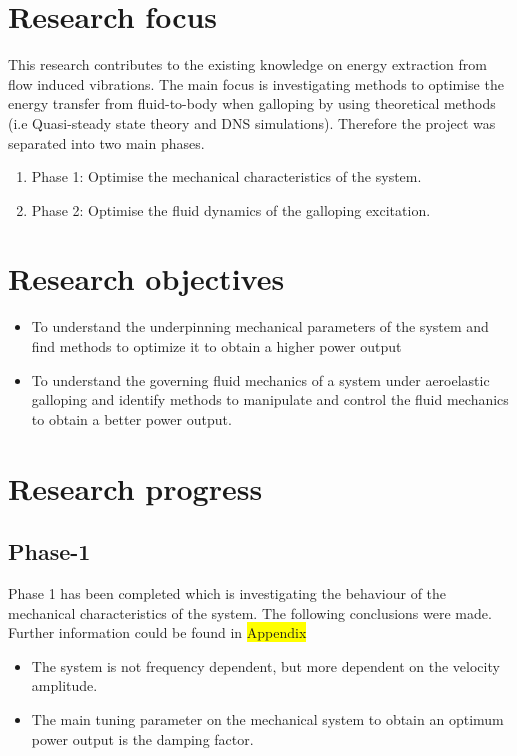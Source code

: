 \documentclass{article}
\newcommand{\hilight}[1]{\colorbox{yellow}{#1}}
\begin{document}
\section{Research focus}
 This research contributes to the existing knowledge on energy extraction from flow induced vibrations. The main focus is investigating methods to optimise the energy transfer from fluid-to-body when galloping by using theoretical methods (i.e Quasi-steady state theory and DNS simulations). Therefore the project was separated into two main phases.
 
\begin{enumerate}[]
\item Phase 1: Optimise the mechanical characteristics of the system.
\item Phase 2: Optimise the fluid dynamics of the galloping excitation.
\end{enumerate}

\section{Research objectives}

\begin{itemize}
\item To understand the underpinning mechanical parameters of the system and find methods to optimize it to obtain a higher power output 
\item To understand the governing fluid mechanics of a system under aeroelastic galloping and identify methods to manipulate and control the fluid mechanics to obtain a better power output.  
\end{itemize}

\section{Research progress}

\subsection{Phase-1}

Phase 1 has been completed which is investigating the behaviour of the mechanical characteristics of the system. The following conclusions were made. Further information could be found in \hilight{Appendix}

\begin{itemize}
\item   The system is not frequency dependent, but more dependent on the velocity amplitude.
\item The main tuning parameter on the mechanical system to obtain an optimum power output is the damping factor.
\end{itemize}
\end{document}
